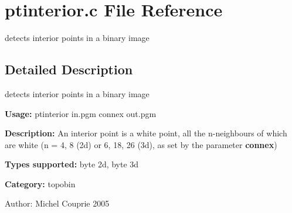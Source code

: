 \section{ptinterior.c File Reference}
\label{ptinterior_8c}
detects interior points in a binary image 



\subsection{Detailed Description}
detects interior points in a binary image 

{\bf Usage:} ptinterior in.pgm connex out.pgm

{\bf Description:} An interior point is a white point, all the n-neighbours of which are white (n = 4, 8 (2d) or 6, 18, 26 (3d), as set by the parameter {\bf connex})

{\bf Types supported:} byte 2d, byte 3d

{\bf Category:} topobin

\begin{Desc}
\item[Author:]Michel Couprie 2005 \end{Desc}
